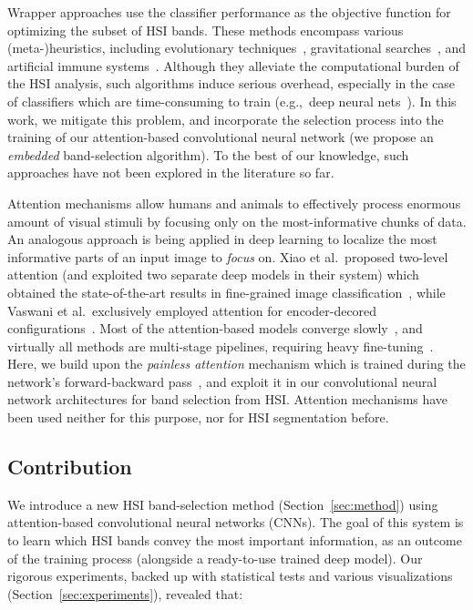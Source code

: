 \documentclass[journal]{IEEEtran}
\begin{document}
Wrapper approaches use the classifier performance as the objective function for optimizing the subset of HSI bands. These methods encompass various (meta-)heuristics, including evolutionary techniques~\cite{Wu2010}, gravitational searches~\cite{WANG201857}, and artificial immune systems~\cite{doi:10.1002/9781119242963.ch11}. Although they alleviate the computational burden of the HSI analysis, such algorithms induce serious overhead, especially in the case of classifiers which are time-consuming to train (e.g.,~deep neural nets~\cite{8113688}). In this work, we mitigate this problem, and incorporate the selection process into the training of our attention-based convolutional neural network (we propose an \emph{embedded} band-selection algorithm). To the best of our knowledge, such approaches have not been explored in the literature so far.

Attention mechanisms allow humans and animals to effectively process enormous amount of visual stimuli by focusing only on the most-informative chunks of data. An analogous approach is being applied in deep learning to localize the most informative parts of an input image to \emph{focus} on. Xiao et al.~proposed two-level attention (and exploited two separate deep models in their system) which obtained the state-of-the-art results in fine-grained image classification~\cite{DBLP:journals/corr/XiaoXYZPZ14}, while Vaswani et al.~exclusively employed attention for encoder-decored configurations~\cite{NIPS2017_7181}. Most of the attention-based models converge slowly~\cite{DBLP:journals/corr/LiuXWL16}, and virtually all methods are multi-stage pipelines, requiring heavy fine-tuning~\cite{8099959,7807286}. Here, we build upon the \textit{painless attention} mechanism which is trained during the network's forward-backward pass~\cite{painlessattention}, and exploit it in our convolutional neural network architectures for band selection from HSI. Attention mechanisms have been used neither for this purpose, nor for HSI segmentation before.

\subsection{Contribution}

We introduce a new HSI band-selection method (Section~\ref{sec:method}) using attention-based convolutional neural networks (CNNs). The goal of this system is to learn which HSI bands convey the most important information, as an outcome of the training process (alongside a ready-to-use trained deep model). Our rigorous experiments, backed up with statistical tests and various visualizations (Section~\ref{sec:experiments}), revealed that:
\end{document}
